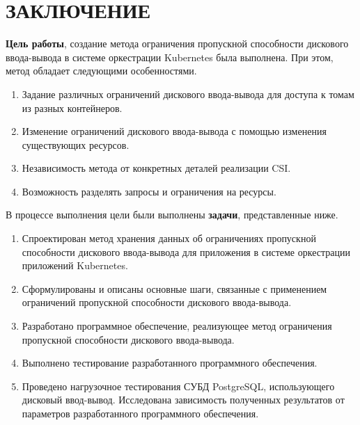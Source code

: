 \chapter*{ЗАКЛЮЧЕНИЕ}

\textbf{Цель работы}, создание метода ограничения пропускной способности дискового ввода-вывода в системе оркестрации Kubernetes была выполнена. При этом, метод обладает следующими особенностями.

\begin{enumerate}
	\item Задание различных ограничений дискового ввода-вывода для доступа к томам из разных контейнеров.
	\item Изменение ограничений дискового ввода-вывода с помощью изменения существующих ресурсов.
	\item Независимость метода от конкретных деталей реализации CSI.
	\item Возможность разделять запросы и ограничения на ресурсы.
\end{enumerate}

В процессе выполнения цели были выполнены \textbf{задачи}, представленные ниже.

\begin{enumerate}
	\item Спроектирован метод хранения данных об ограничениях пропускной способности дискового ввода-вывода для приложения в системе оркестрации приложений Kubernetes.
	\item Сформулированы и описаны основные шаги, связанные с применением ограничений пропускной способности дискового ввода-вывода.
	\item Разработано программное обеспечение, реализующее метод ограничения пропускной способности дискового ввода-вывода.
	\item Выполнено тестирование разработанного программного обеспечения.
	\item Проведено нагрузочное тестирования СУБД PostgreSQL, использующего дисковый ввод-вывод. Исследована зависимость полученных результатов от параметров разработанного программного обеспечения.
\end{enumerate}